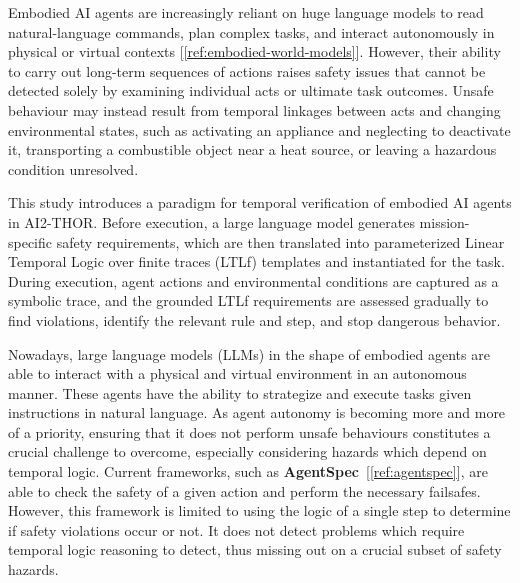 \documentclass [11pt,twoside]{article}
\begin{document}
{}
Embodied AI agents are increasingly reliant on huge language models 
to read natural-language commands, plan complex tasks, and interact 
autonomously in physical or virtual contexts [\ref{ref:embodied-world-models}]. 
However, their ability to carry out long-term sequences of actions raises safety 
issues that cannot be detected solely by examining individual acts or ultimate 
task outcomes. Unsafe behaviour may instead result from temporal linkages 
between acts and changing environmental states, such as activating an appliance 
and neglecting to deactivate it, transporting a combustible object near a heat 
source, or leaving a hazardous condition unresolved.

This study introduces a paradigm for temporal verification of embodied AI agents 
in AI2-THOR. Before execution, a large language model generates mission-specific 
safety requirements, which are then translated into parameterized 
Linear Temporal Logic over finite traces (LTLf) templates and instantiated for 
the task. During execution, agent actions and environmental conditions are 
captured as a symbolic trace, and the grounded LTLf requirements are assessed 
gradually to find violations, identify the relevant rule and step, and stop 
dangerous behavior.

{}
Nowadays, large language models (LLMs) in the shape of embodied agents are able to interact with a physical and virtual environment in an autonomous manner.
These agents have the ability to strategize and execute tasks given instructions in natural language. As agent autonomy is becoming more
and more of a priority, ensuring that it does not perform unsafe behaviours constitutes a crucial challenge to overcome, especially considering
hazards which depend on temporal logic. Current frameworks, such as \textbf{AgentSpec}~[\ref{ref:agentspec}], are able to check the safety of a given action and perform the necessary failsafes.
However, this framework is limited to using the logic of a single step to determine if safety violations occur or not. It does not detect
problems which require temporal logic reasoning to detect, thus missing out on a crucial subset of safety hazards.
\end{document}
